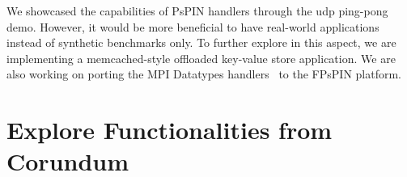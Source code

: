 We showcased the capabilities of PsPIN handlers through the \ac{udp} ping-pong demo.  However, it would be more beneficial to have real-world applications instead of synthetic benchmarks only.  To further explore in this aspect, we are implementing a memcached-style offloaded key-value store application.  We are also working on porting the MPI Datatypes handlers~\cite{di_girolamo_network-accelerated_2019} to the FPsPIN platform.

\section{Explore Functionalities from Corundum}

